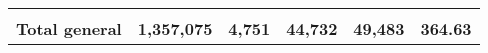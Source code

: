 \begin{tabular}{lrcclr}
	& \multicolumn{1}{l}{}                                           & \multicolumn{1}{l}{}                                       & \multicolumn{1}{l}{} &                                                                     & \multicolumn{1}{l}{}                                                         \\
	\rowcolor[HTML]{DDEBF7} 
	\textbf{Total   general}                                       & \textbf{1,357,075}                                             & \multicolumn{1}{r}{\cellcolor[HTML]{DDEBF7}\textbf{4,751}} & \textbf{44,732}      & \textbf{49,483}                                                     & \textbf{364.63}                                                             
\end{tabular}